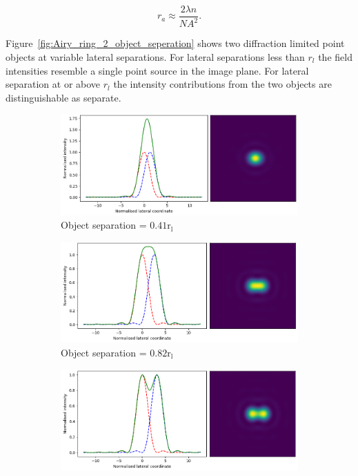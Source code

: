 \begin{equation}\label{eq:axial_res}
r_a \approx \frac{2\lambda n}{NA^{2}}.
\end{equation}

Figure~\ref{fig:Airy_ring_2_object_seperation} shows two 
diffraction limited point objects at variable lateral separations. For 
lateral separations less than $r_{l}$ the field intensities resemble a single 
point source in the image plane. For lateral separation at or above $r_{l}$ 
the intensity contributions from the two objects are distinguishable as 
separate.

\begin{figure}[h]
	\centering
	\begin{subfigure}{0.49\textwidth}
		\centering
		\includegraphics[width=\linewidth]{images/Airy_ring_2_object_seperation_0_5.png}
		\caption{Object separation = $0.41\text{r}_{\text{l}}$}
		\label{fig:Airy_ring_2_object_seperation_0_5}
	\end{subfigure}
	\begin{subfigure}{0.49\textwidth}
		\centering
		\includegraphics[width=\linewidth]{images/Airy_ring_2_object_seperation_1_0.png}
		\caption{Object separation = $0.82\text{r}_{\text{l}}$}
		\label{fig:Airy_ring_2_object_seperation_1_0}
	\end{subfigure}
	\begin{subfigure}{0.49\textwidth}
		\centering
		\includegraphics[width=\linewidth]{images/Airy_ring_2_object_seperation_1_22.png}

\end{subfigure}
\end{figure}
